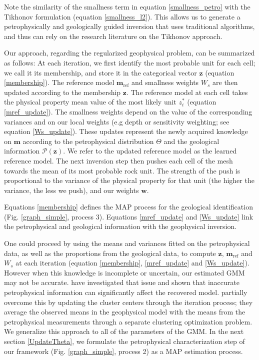 \documentclass[extra]{gji} %
\begin{document}
Note the similarity of the smallness term in equation \ref{smallness_petro} with the Tikhonov formulation (equation \ref{smallness_l2}). This allows us to generate a petrophysically and geologically guided inversion that uses traditional algorithms, and thus can rely on the research literature on the Tikhonov approach.

Our approach, regarding the regularized geophysical problem, can be summarized as follows: At each iteration, we first identify the most probable unit for each cell; we call it its membership, and store it in the categorical vector $\mathbf{z}$ (equation \ref{membership}). The reference model $\mathbf{m}_{\text{ref}}$ and smallness weights $W_s$ are then updated according to the membership $\mathbf{z}$. The reference model at each cell takes the physical property mean value of the most likely unit ${z^*_i}$ (equation \ref{mref_update}). The smallness weights depend on the value of the corresponding variances and on our local weights (e.g depth or sensitivity weighting; see equation \ref{Ws_update}). These updates represent the newly acquired knowledge on $\mathbf{m}$ according to the petrophysical distribution $\Theta$ and the geological information $\mathcal{P}(\mathbf{z})$. We refer to the updated reference model as the learned reference model. The next inversion step then pushes each cell of the mesh towards the mean of its most probable rock unit. The strength of the push is proportional to the variance of the physical property for that unit (the higher the variance, the less we push), and our weights $\mathbf{w}$.

Equations \ref{membership} defines the MAP process for the geological identification (Fig. \ref{graph_simple}, process 3). Equations \ref{mref_update} and \ref{Ws_update} link the petrophysical and geological information with the geophysical inversion.

One could proceed by using the means and variances fitted on the petrophysical data, as well as the proportions from the geological data, to compute $\mathbf{z}$, $\mathbf{m}_{\text{ref}}$ and $W_s$ at each iteration (equation \ref{membership}, \ref{mref_update} and \ref{Ws_update}). However when this knowledge is incomplete or uncertain, our estimated GMM may not be accurate. \cite{McAuslan2015} have investigated that issue and shown that inaccurate petrophysical information can significantly affect the recovered model. \cite{Sun2015, Sun2016, Sun2017} partially overcome this by updating the cluster centers through the iteration process; they average the observed means in the geophysical model with the means from the petrophysical measurements through a separate clustering optimization problem. We generalize this approach to all of the parameters of the GMM. In the next section \ref{UpdateTheta}, we formulate the petrophysical characterization step of our framework (Fig. \ref{graph_simple}, process 2) as a MAP estimation process.
\end{document}

